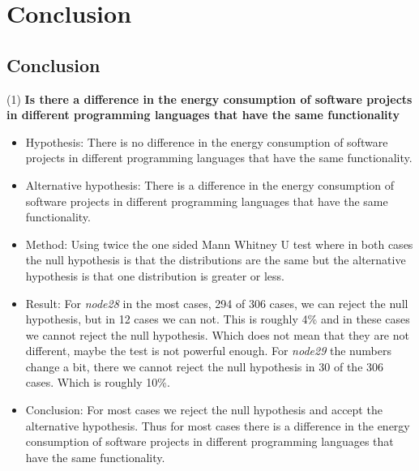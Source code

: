 \chapter{Conclusion}
\label{ch:conclusion}

\section{Conclusion}
(1) \textbf{Is there a difference in the energy consumption of software projects in different programming languages that have the same functionality}
\begin{itemize}
\item Hypothesis: There is no difference in the energy consumption of software projects in different programming languages that have the same functionality.
\item Alternative hypothesis: There is a difference in the energy consumption of software projects in different programming languages that have the same functionality.
\item Method: Using twice the one sided Mann Whitney U test where in both cases the null hypothesis is that the distributions are the same but the alternative hypothesis is that one distribution is greater or less.
\item Result: For \textit{node28} in the most cases, 294 of 306 cases, we can reject the null hypothesis, but in 12 cases we can not. This is roughly 4\% and in these cases we cannot reject the null hypothesis. Which does not mean that they are not different, maybe the test is not powerful enough. For \textit{node29} the numbers change a bit, there we cannot reject the null hypothesis in 30 of the 306 cases. Which is roughly 10\%.
\item Conclusion: For most cases we reject the null hypothesis and accept the alternative hypothesis. Thus for most cases there is a difference in the energy consumption of software projects in different programming languages that have the same functionality.\\
\end{itemize}


